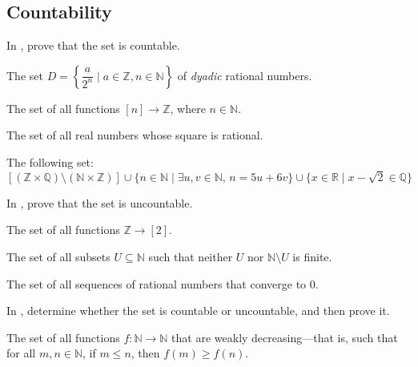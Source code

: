 \subsection*{Countability}

In , prove that the set is countable.

\begin{chapex}
\label{cqProveCountableBegin}
The set $D = \left\{ \dfrac{a}{2^n} \mid a \in \mathbb{Z}, n \in \mathbb{N} \right\}$ of \textit{dyadic} rational numbers.
\end{chapex}

\begin{chapex}
The set of all functions $[n] \to \mathbb{Z}$, where $n \in \mathbb{N}$.
\end{chapex}

\begin{chapex}
The set of all real numbers whose square is rational.
\end{chapex}

\begin{chapex}
\label{cqProveCountableEnd}
The following set:
\[
[(\mathbb{Z} \times \mathbb{Q}) \setminus (\mathbb{N} \times \mathbb{Z})] \cup \{ n \in \mathbb{N} \mid \exists u,v \in \mathbb{N},\, n=5u+6v \} \cup \{ x \in \mathbb{R} \mid x-\sqrt{2} \in \mathbb{Q} \}
\]
\end{chapex}

In , prove that the set is uncountable.

\begin{chapex}
\label{cqProveUncountableBegin}
The set of all functions $\mathbb{Z} \to [2]$.
\end{chapex}

\begin{chapex}
The set of all subsets $U \subseteq \mathbb{N}$ such that neither $U$ nor $\mathbb{N} \setminus U$ is finite.
\end{chapex}

\begin{chapex}
\label{cqProveUncountableEnd}
The set of all sequences of rational numbers that converge to $0$.
\end{chapex}

In , determine whether the set is countable or uncountable, and then prove it.

\begin{chapex}
\label{cqDetermineIfCountableBegin}
The set of all functions $f : \mathbb{N} \to \mathbb{N}$ that are weakly decreasing---that is, such that for all $m,n \in \mathbb{N}$, if $m \le n$, then $f(m) \ge f(n)$.
\end{chapex}

